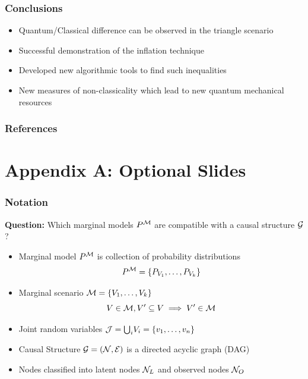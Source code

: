 \documentclass[
    hyperref={bookmarks=false},%
    xcolor={dvipsnames},
]{beamer}
\renewcommand{\term}[1]{\textcolor{Mahogany}{#1}}
\begin{document}
\begin{frame}
    \frametitle{Conclusions}
    \begin{itemize}
        \item Quantum/Classical difference can be observed in the triangle scenario
        \item Successful demonstration of the inflation technique
        \item Developed new algorithmic tools to find such inequalities
        \item New measures of non-classicality which lead to new quantum mechanical resources
    \end{itemize}
\end{frame}

\begin{frame}[allowframebreaks]
    \frametitle{References}
    \printbibliography
\end{frame}

\section{Appendix A: Optional Slides}

\begin{frame}
    \frametitle{Notation}
    \textbf{Question:} Which marginal models $\prob^{\mscenario}$ are \term{compatible} with a causal structure $\mathcal{G}$?\\
    \begin{itemize}
        \item \term{Marginal model} $\prob^{\mscenario}$ is collection of probability distributions
        \[ \prob^{\mscenario} = \bc{\prob[V_1], \ldots, \prob[V_k]} \]
        \item \term{Marginal scenario} $\mscenario = \bc{V_1, \ldots, V_k}$
        \[ V \in \mathcal{M}, V' \subseteq V  \implies V' \in \mathcal{M} \]
        \item \term{Joint random variables} $\jointvar = {\bigcup}_{i} V_i = \bc{v_1, \ldots, v_n}$
        \item \term{Causal Structure} $\graph = \br{\nodes, \edges}$ is a directed acyclic graph (DAG)
        \item Nodes classified into \term{latent nodes} $\mathcal{N}_{L}$ and \term{observed nodes} $\mathcal{N}_{O}$
    \end{itemize}
\end{frame}
\end{document}
